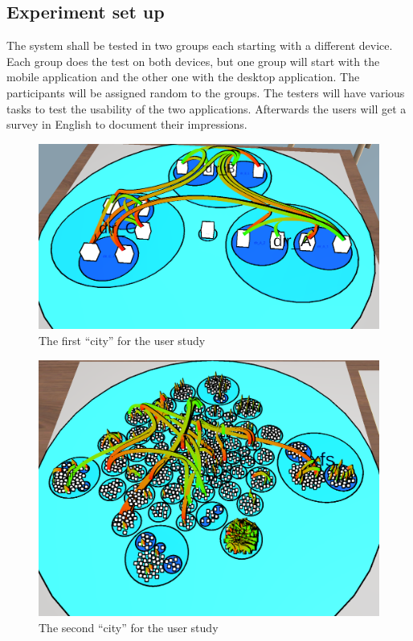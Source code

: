 \subsection{Experiment set up}
\label{experiment}
The system shall be tested in two groups each starting with a different device. 
Each group does the test on both devices, but one group will start with the mobile application and the other one with the desktop application.
The participants will be assigned random to the groups.
The testers will have various tasks to test the usability of the two applications. 
Afterwards the users will get a survey in English to document their impressions.
\begin{figure}[htb]
  \centering
  \includegraphics[width=1\textwidth]{Evaluation/img/city_1.png}
  \caption{The first \enquote{\gls{city}} for the user study}\label{fig:city1}
\end{figure}

\begin{figure}[htb]
  \centering
  \includegraphics[width=1\textwidth]{Evaluation/img/city_2.png}
  \caption{The second \enquote{\gls{city}} for the user study}\label{fig:city2}
\end{figure}

